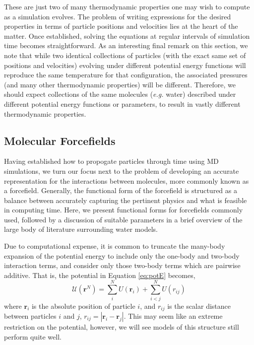 These are just two of many thermodynamic properties one may wish to
compute as a simulation evolves. The problem of writing expressions
for the desired properties in terms of particle positions and
velocities lies at the heart of the matter. Once established, solving
the equations at regular intervals of simulation time becomes
straightforward. As an interesting final remark on this section, we
note that while two identical collections of particles (with the exact
same set of positions and velocities) evolving under different
potential energy functions will reproduce the same temperature for
that configuration, the associated pressures (and many other
thermodynamic properties) will be different. Therefore, we should
expect collections of the same molecules (\textit{e.g.} water)
described under different potential energy functions or parameters, to
result in vastly different thermodynamic properties.

\subsection{Molecular Forcefields}
Having established how to propogate particles through time using MD
simulations, we turn our focus next to the problem of developing an
accurate representation for the interactions between molecules, more
commonly known as a forcefield. Generally, the functional form of the
forcefield is structured as a balance between accurately capturing the
pertinent physics and what is feasible in computing time. Here, we
present functional forms for forcefields commonly used, followed by a
discussion of suitable parameters in a brief overview of the large
body of literature surrounding water models.

Due to computational expense, it is common to truncate the many-body
expansion of the potential energy to include only the one-body and
two-body interaction terms, and consider only those two-body terms
which are pairwise additive. That is, the potential in Equation
\eqref{eq:potE} becomes,
\begin{equation}\label{eq:potPair}
\mathscr{U}(\mathbf{r}^N) = \sum_i^N U(\mathbf{r}_i) + \sum_{i<j}^N U(r_{ij})
\end{equation}
where $\mathbf{r}_i$ is the absolute position of particle $i$, and
$r_{ij}$ is the scalar distance between particles $i$ and $j$,
$r_{ij} = | \mathbf{r}_i - \mathbf{r}_j|$. This may seem like an
extreme restriction on the potential, however, we will see models of
this structure still perform quite well. 

